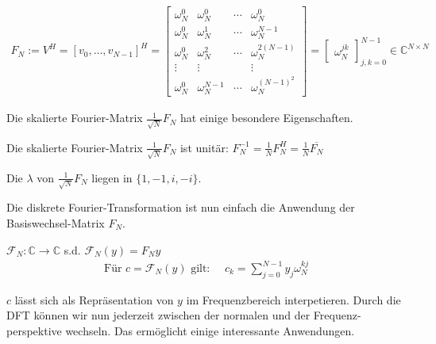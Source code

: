 \\
\begin{align*}
    F_N := V^H = [v_0, \ldots, v_{N-1}]^H = \begin{bmatrix}
        \omega_N^0 & \omega_N^0 & \cdots & \omega_N^0 \\
        \omega_N^0 & \omega_N^1 & \cdots & \omega_N^{N-1} \\
        \omega_N^0 & \omega_N^2 & \cdots & \omega_N^{2(N-1)} \\
        \vdots     & \vdots     &        & \vdots \\
        \omega_N^0 & \omega_N^{N-1} &\cdots & \omega_N^{(N-1)^2} 
    \end{bmatrix}
    = 
    \begin{bmatrix}
        \omega_N^{jk}
    \end{bmatrix}^{N-1}_{j,k = 0} 
    \in \mathbb{C}^{N\times N}
\end{align*}

Die skalierte Fourier-Matrix $\frac{1}{\sqrt{N}}F_N$ hat einige besondere Eigenschaften.

\setcounter{all}{6}
\inlinetheorem Die skalierte Fourier-Matrix $\frac{1}{\sqrt{N}}F_N$ ist unitär: $F_N^{-1} = \frac{1}{N} F_N^H = \frac{1}{N} \overline{F_N}$

 Die $\lambda$ von $\frac{1}{\sqrt{N}}F_N$ liegen in $\{1,-1,i,-i\}$.

Die diskrete Fourier-Transformation ist nun einfach die Anwendung der Basiswechsel-Matrix $F_N$.

\setcounter{all}{5}
 $\mathcal{F}_N: \mathbb{C} \to \mathbb{C}$ s.d. $\mathcal{F}_N(y) = F_Ny$
\begin{align*}
    \text{Für } c = \mathcal{F}_N(y) \text{ gilt: }\quad c_k = \sum_{j=0}^{N-1} y_j \omega_N^{kj}
\end{align*}

$c$ lässt sich als Repräsentation von $y$ im Frequenzbereich interpetieren. Durch die DFT können wir nun jederzeit zwischen der normalen und der Frequenz-perspektive wechseln. Das ermöglicht einige interessante Anwendungen.
